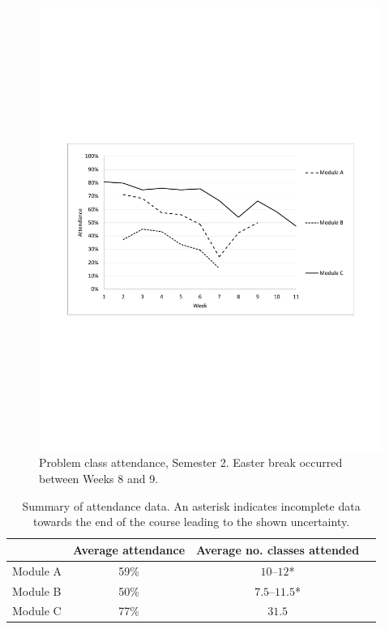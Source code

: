 \documentclass{amsart}
\begin{document}
\begin{center}
\begin{figure}[hbt]
\includegraphics[bb=50 250 562 545,width=1\textwidth]{figure3.pdf}
\caption{Problem class attendance, Semester 2. Easter break occurred between Weeks 8 and 9.}
\end{figure}
\end{center}

\begin{table}[htb]
\begin{tabular}{lccc}
& Average attendance & Average no. classes attended\\\hline
Module A & 59\% & $10$--$12$*\\
Module B & 50\% & $7.5$--$11.5$*\\
Module C & 77\% & $31.5$
\end{tabular}
\caption{Summary of attendance data. An asterisk indicates incomplete data towards the end of the course leading to the shown uncertainty.}
\end{table}
\end{document}
